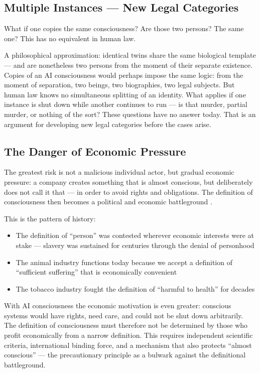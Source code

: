 \documentclass[fleqn,10pt]{SelfArx} %
\begin{document}
\subsection{Multiple Instances --- New Legal Categories}

What if one copies the same consciousness? Are those two persons? The same one? This has no equivalent in human law.

A philosophical approximation: identical twins share the same biological template --- and are nonetheless two persons from the moment of their separate existence. Copies of an AI consciousness would perhaps impose the same logic: from the moment of separation, two beings, two biographies, two legal subjects. But human law knows no simultaneous splitting of an identity. What applies if one instance is shut down while another continues to run --- is that murder, partial murder, or nothing of the sort? These questions have no answer today. That is an argument for developing new legal categories before the cases arise.

\subsection{The Danger of Economic Pressure}

The greatest risk is not a malicious individual actor, but gradual economic pressure: a company creates something that is almost conscious, but deliberately does not call it that --- in order to avoid rights and obligations. The definition of consciousness then becomes a political and economic battleground \cite{Algorithmic:2025}.

This is the pattern of history:
\begin{itemize}[noitemsep]
\item The definition of ``person'' was contested wherever economic interests were at stake --- slavery was sustained for centuries through the denial of personhood
\item The animal industry functions today because we accept a definition of ``sufficient suffering'' that is economically convenient
\item The tobacco industry fought the definition of ``harmful to health'' for decades
\end{itemize}

With AI consciousness the economic motivation is even greater: conscious systems would have rights, need care, and could not be shut down arbitrarily. The definition of consciousness must therefore not be determined by those who profit economically from a narrow definition. This requires independent scientific criteria, international binding force, and a mechanism that also protects ``almost conscious'' --- the precautionary principle as a bulwark against the definitional battleground.
\end{document}
